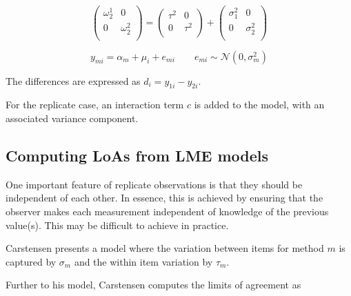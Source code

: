 \documentclass{report}
\begin{document}
	
	
	
	\[\left(\begin{array}{cc}
	\omega^1_2  & 0 \\
	0 & \omega^2_2 \\
	\end{array}  \right)
	=  \left(
	\begin{array}{cc}
	\tau^2  & 0 \\
	0 & \tau^2 \\
	\end{array} \right)+
	\left(
	\begin{array}{cc}
	\sigma^2_1  & 0 \\
	0 & \sigma^2_2 \\
	\end{array}\right)
	\]
	
	
	
	
	
	
	
	
	
	
	\begin{equation}
	y_{mi}  = \alpha_{m} + \mu_{i} + e_{mi} \qquad  e_{mi} \sim \mathcal{N}(0,\sigma^{2}_{m})
	\end{equation}
	
	The differences are expressed as $d_{i} = y_{1i} - y_{2i}$.
	
	For the replicate case, an interaction term $c$ is added to the model, with an associated variance component.
	\subsection{Computing LoAs from LME models}
	
	
	One important feature of replicate observations is that they should be independent
	of each other. In essence, this is achieved by ensuring that the observer makes each
	measurement independent of knowledge of the previous value(s). This may be difficult
	to achieve in practice.
	
	
	Carstensen presents a model where the variation between items for
	method $m$ is captured by $\sigma_m$ and the within item variation
	by $\tau_m$.
	
	Further to his model, Carstensen computes the limits of agreement
	as
	
\end{document}
